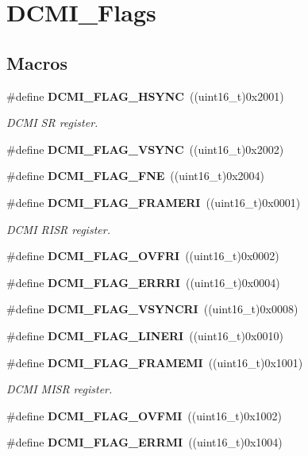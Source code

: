 \section{D\+C\+M\+I\+\_\+\+Flags}
\label{group__DCMI__Flags}
\subsection*{Macros}
\begin{DoxyCompactItemize}
\item 
\#define \textbf{ D\+C\+M\+I\+\_\+\+F\+L\+A\+G\+\_\+\+H\+S\+Y\+NC}~((uint16\+\_\+t)0x2001)
\begin{DoxyCompactList}\small\item\em D\+C\+MI SR register. \end{DoxyCompactList}\item 
\#define \textbf{ D\+C\+M\+I\+\_\+\+F\+L\+A\+G\+\_\+\+V\+S\+Y\+NC}~((uint16\+\_\+t)0x2002)
\item 
\#define \textbf{ D\+C\+M\+I\+\_\+\+F\+L\+A\+G\+\_\+\+F\+NE}~((uint16\+\_\+t)0x2004)
\item 
\#define \textbf{ D\+C\+M\+I\+\_\+\+F\+L\+A\+G\+\_\+\+F\+R\+A\+M\+E\+RI}~((uint16\+\_\+t)0x0001)
\begin{DoxyCompactList}\small\item\em D\+C\+MI R\+I\+SR register. \end{DoxyCompactList}\item 
\#define \textbf{ D\+C\+M\+I\+\_\+\+F\+L\+A\+G\+\_\+\+O\+V\+F\+RI}~((uint16\+\_\+t)0x0002)
\item 
\#define \textbf{ D\+C\+M\+I\+\_\+\+F\+L\+A\+G\+\_\+\+E\+R\+R\+RI}~((uint16\+\_\+t)0x0004)
\item 
\#define \textbf{ D\+C\+M\+I\+\_\+\+F\+L\+A\+G\+\_\+\+V\+S\+Y\+N\+C\+RI}~((uint16\+\_\+t)0x0008)
\item 
\#define \textbf{ D\+C\+M\+I\+\_\+\+F\+L\+A\+G\+\_\+\+L\+I\+N\+E\+RI}~((uint16\+\_\+t)0x0010)
\item 
\#define \textbf{ D\+C\+M\+I\+\_\+\+F\+L\+A\+G\+\_\+\+F\+R\+A\+M\+E\+MI}~((uint16\+\_\+t)0x1001)
\begin{DoxyCompactList}\small\item\em D\+C\+MI M\+I\+SR register. \end{DoxyCompactList}\item 
\#define \textbf{ D\+C\+M\+I\+\_\+\+F\+L\+A\+G\+\_\+\+O\+V\+F\+MI}~((uint16\+\_\+t)0x1002)
\item 
\#define \textbf{ D\+C\+M\+I\+\_\+\+F\+L\+A\+G\+\_\+\+E\+R\+R\+MI}~((uint16\+\_\+t)0x1004)

\end{DoxyCompactItemize}

